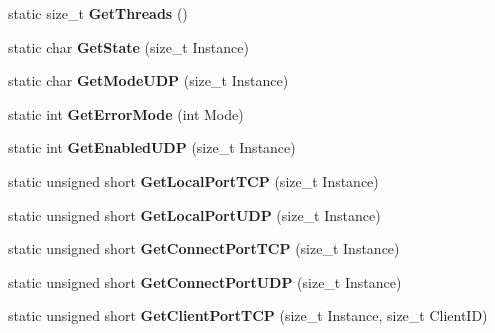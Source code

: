\begin{DoxyCompactItemize}
\item 
\hypertarget{structmn_c_l_r_a72813ca05b05990e80f32f7915cf30cc}{
static size\_\-t {\bfseries GetThreads} ()}
\label{structmn_c_l_r_a72813ca05b05990e80f32f7915cf30cc}

\item 
\hypertarget{structmn_c_l_r_af00fda9f341ea1935a7e2036484b5378}{
static char {\bfseries GetState} (size\_\-t Instance)}
\label{structmn_c_l_r_af00fda9f341ea1935a7e2036484b5378}

\item 
\hypertarget{structmn_c_l_r_a7914a903f4a712941da928c88d706f9b}{
static char {\bfseries GetModeUDP} (size\_\-t Instance)}
\label{structmn_c_l_r_a7914a903f4a712941da928c88d706f9b}

\item 
\hypertarget{structmn_c_l_r_a4f050975a35050542a0ae8ad9a575541}{
static int {\bfseries GetErrorMode} (int Mode)}
\label{structmn_c_l_r_a4f050975a35050542a0ae8ad9a575541}

\item 
\hypertarget{structmn_c_l_r_ae17aee1ecf0124883fb478c71ce93e91}{
static int {\bfseries GetEnabledUDP} (size\_\-t Instance)}
\label{structmn_c_l_r_ae17aee1ecf0124883fb478c71ce93e91}

\item 
\hypertarget{structmn_c_l_r_ab7e362f1d79623164051d418bf81d681}{
static unsigned short {\bfseries GetLocalPortTCP} (size\_\-t Instance)}
\label{structmn_c_l_r_ab7e362f1d79623164051d418bf81d681}

\item 
\hypertarget{structmn_c_l_r_a65336a77e50370f864439890816d227a}{
static unsigned short {\bfseries GetLocalPortUDP} (size\_\-t Instance)}
\label{structmn_c_l_r_a65336a77e50370f864439890816d227a}

\item 
\hypertarget{structmn_c_l_r_a0eb773b4a23aff0eaa5eb3b01583ce78}{
static unsigned short {\bfseries GetConnectPortTCP} (size\_\-t Instance)}
\label{structmn_c_l_r_a0eb773b4a23aff0eaa5eb3b01583ce78}

\item 
\hypertarget{structmn_c_l_r_aa9cc4baaabe68e70168df9a49c6c2366}{
static unsigned short {\bfseries GetConnectPortUDP} (size\_\-t Instance)}
\label{structmn_c_l_r_aa9cc4baaabe68e70168df9a49c6c2366}

\item 
\hypertarget{structmn_c_l_r_ac50df16c12baefbf627f9ac20e855b71}{
static unsigned short {\bfseries GetClientPortTCP} (size\_\-t Instance, size\_\-t ClientID)}
\label{structmn_c_l_r_ac50df16c12baefbf627f9ac20e855b71}


\end{DoxyCompactItemize}
